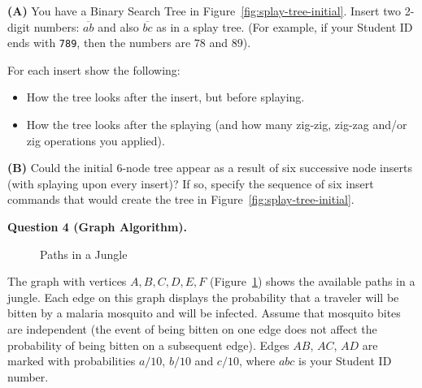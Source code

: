 \documentclass[a4paper,12pt]{article}
\begin{document}
\vspace{5pt}
{\bf (A)} You have a Binary Search Tree in Figure~\ref{fig:splay-tree-initial}.
Insert two 2-digit numbers: $\overline{ab}$ and also 
$\overline{bc}$ as in a splay tree. (For example, if your Student ID ends with {\tt 789}, 
then the numbers are $78$ and $89$). 

For each insert show the following: 
\begin{itemize}
\item How the tree looks after the insert, but before splaying. 
\item How the tree looks after the splaying (and how many zig-zig, 
zig-zag and/or zig operations you applied). 
\end{itemize}

\vspace{5pt}
{\bf (B)} Could the initial 6-node tree 
appear as a result of six successive node inserts (with splaying upon 
every insert)? 
If so, specify the sequence of six insert commands that would create
the tree in Figure~\ref{fig:splay-tree-initial}.

\newpage



\newpage

\vspace{20pt}
{\bf Question 4 (Graph Algorithm).} 

\begin{figure}[!htb]
\caption{\label{fig:dijkstra-algorithm} Paths in a Jungle}
\end{figure}

The graph with vertices $A,B,C,D,E,F$ (Figure~\ref{fig:dijkstra-algorithm}) shows 
the available paths in a jungle. Each edge on this 
graph displays the probability that a traveler will 
be bitten by a malaria mosquito and will be infected. 
Assume that mosquito bites are independent
(the event of being bitten on one edge does 
not affect the probability of being bitten on a subsequent edge).
Edges $AB$, $AC$, $AD$ are marked with probabilities $a/10$, 
$b/10$ and $c/10$, where $abc$ is your Student ID number.
\end{document}
